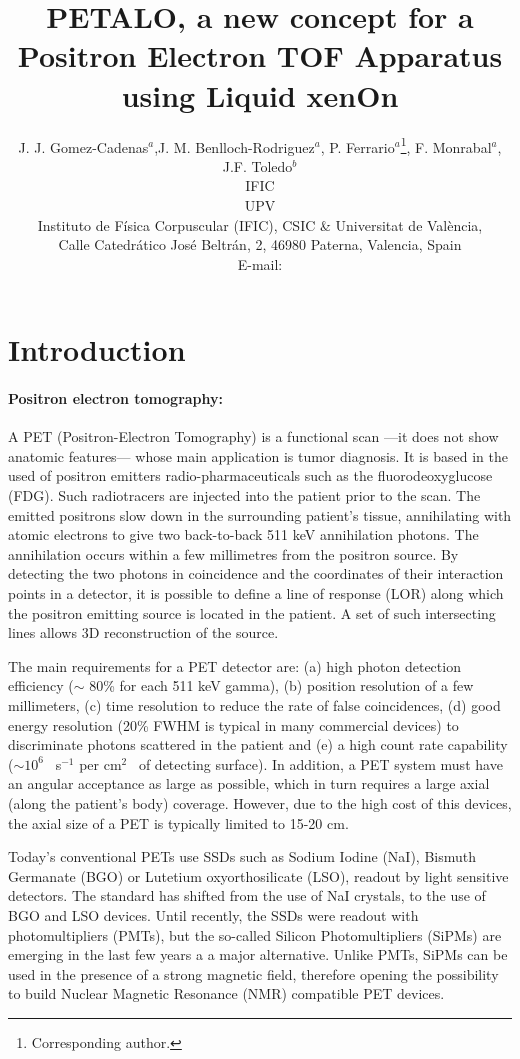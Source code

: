 \documentclass{JINST}
\title{PETALO, a new concept for a Positron Electron TOF Apparatus using Liquid xenOn}
\author{J. J. Gomez-Cadenas$^a$,J. M. Benlloch-Rodriguez$^a$, P. Ferrario$^a$\thanks{Corresponding author.}, 
F. Monrabal$^a$, J.F. Toledo$^b$

\llap{$^a$}IFIC\\
\llap{$^b$}UPV\\
\llap{$^b$}Instituto de F\'isica Corpuscular (IFIC), CSIC \& Universitat de Val\`encia,\\ 
Calle Catedr\'atico Jos\'e Beltr\'an, 2, 46980 Paterna, Valencia, Spain\\

E-mail: \email{gomez@mail.cern.ch}}
\begin{document}
\section{Introduction}

\label{sec.intro}

\paragraph{Positron electron tomography:}

A PET (Positron-Electron Tomography) is a functional scan ---it does not show anatomic features--- whose main application is tumor diagnosis. It is based in the used of positron emitters radio-pharmaceuticals such as the fluorodeoxyglucose (FDG). Such radiotracers 
are injected into the patient prior to the scan. The emitted positrons slow down in the surrounding patient’s tissue, annihilating with atomic electrons to give two back-to-back 511 keV annihilation photons. The annihilation occurs within a few millimetres from the positron source. By detecting the two photons in coincidence and the coordinates of their interaction points in a detector, it is possible to define a line of response (LOR) along which the positron emitting source is located in the patient. A set of such intersecting lines allows 3D reconstruction of the source. 

The main requirements for a PET detector are: (a) high photon detection efficiency ($\sim$ 80\% for each 511 keV gamma), (b) position resolution of a few millimeters, (c) time resolution to reduce the rate of false coincidences, (d) good energy resolution (20\% FWHM is typical in many commercial devices) to discriminate photons scattered in the patient and (e) a high count rate capability ($\sim10^6$~ s$^{-1}$ per cm$^2$~ of detecting surface). In addition, a PET system must have an angular acceptance as large as possible, which in turn requires a large axial (along the patient's body) coverage. However, due to the high cost of this devices, the axial size  of a PET is typically limited to 15-20 cm. 

Today's conventional PETs use SSDs such as Sodium Iodine (NaI), Bismuth Germanate (BGO) or Lutetium oxyorthosilicate (LSO), readout by light sensitive detectors. The standard has shifted from the use of NaI crystals, to the use of BGO and LSO devices. Until recently, the SSDs were readout with photomultipliers (PMTs), but the so-called Silicon Photomultipliers (SiPMs) are emerging in the last few years a a major alternative. Unlike PMTs, SiPMs can be used in the presence of a strong magnetic field, therefore opening the possibility to build Nuclear Magnetic Resonance (NMR) compatible PET devices. 
\end{document}
